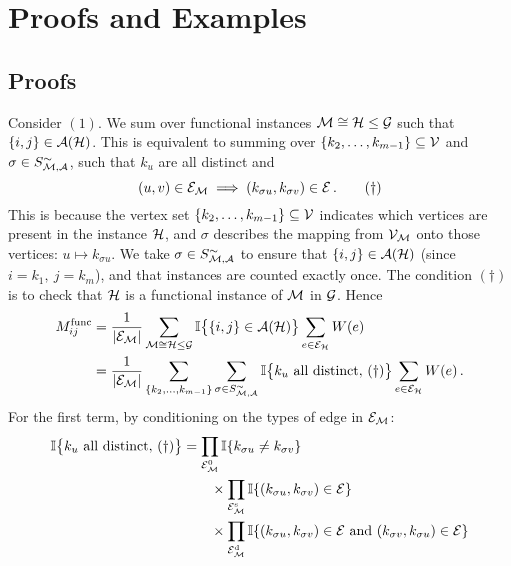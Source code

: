 \chapter{Proofs and Examples}\label{chap:appendix_proofs}

\section{Proofs}






\begin{prf} \label{proof:motif_adj_matrix_formula}
%
Consider $(1)$. We sum over functional instances $\mathcal{M} \cong \mathcal{H} \leq \mathcal{G}$ such that $\{i,j\} \in \mathcal{A(H)}$.
This is equivalent to summing over $\{k_2, \ldots, k_{m-1}\} \subseteq \mathcal{V}$ and $\sigma \in S_{\mathcal{M,A}}^\sim$, such that $k_u$ are all distinct and
%
$$ (u,v) \in \mathcal{E_M} \implies (k_{\sigma u}, k_{\sigma v}) \in \mathcal{E}\,. \qquad (\dagger) $$
%
This is because the vertex set $\{k_2, \ldots, k_{m-1}\} \subseteq \mathcal{V}$ indicates which vertices are present in the instance $\mathcal{H}$, and $\sigma$ describes the mapping from $\mathcal{V_M}$ onto those vertices: $u \mapsto k_{\sigma u}$. We take $\sigma \in S_{\mathcal{M,A}}^\sim$ to ensure that $\{i,j\} \in \mathcal{A(H)}$ (since $i=k_1, \ j=k_m$), and that instances are counted exactly once.
The condition $(\dagger)$ is to check that $\mathcal{H}$ is a functional instance of $\mathcal{M}$ in $\mathcal{G}$. Hence
%
\begin{align*}
	M^\mathrm{func}_{ij} &= \frac{1}{|\ca{E_M}|} \sum_{\ca{M} \cong \ca{H} \leq \ca{G}} \bb{I} \big\{ \{i,j\} \in \ca{A}(\ca{H}) \big\} \sum_{e \in \ca{E_H}} W(e) \\
%	
	&=  \frac{1}{|\ca{E_M}|} \sum_{\{ k_2, \ldots, k_{m-1} \}} \sum_{\sigma \in S_\ca{M,A}^\sim} \bb{I} \big\{ k_u \textrm{ all distinct}, \, (\dagger) \big\} \sum_{e \in \ca{E_H}} W(e)\,.
\end{align*}
%
For the first term, by conditioning on the types of edge in $\mathcal{E_M}$:
\begin{align*}
%
	\bb{I} \big\{ k_u \textrm{ all distinct}, \, (\dagger) \big\}
	&= \prod_{\ca{E}_\ca{M}^0} \bb{I} \{ k_{\sigma u} \neq k_{\sigma v} \} \\
	& \qquad \times \prod_{\ca{E}_\ca{M}^\mathrm{s}} \bb{I} \{ (k_{\sigma u}, k_{\sigma v}) \in \ca{E} \} \\
	& \qquad \times \prod_{\ca{E}_\ca{M}^\mathrm{d}} \bb{I} \{(k_{\sigma u}, k_{\sigma v}) \in \ca{E} \textrm{ and } (k_{\sigma v}, k_{\sigma u}) \in \ca{E}\} \\

\end{align*}
\end{prf}
